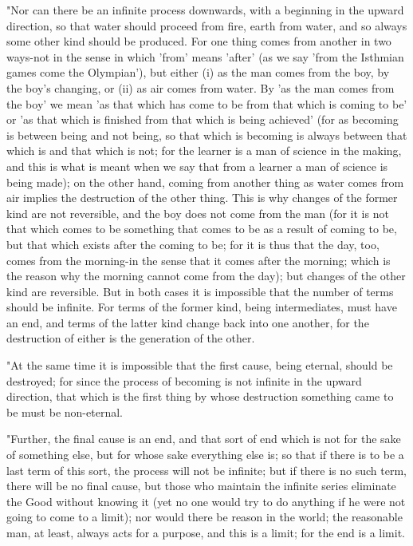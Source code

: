 "Nor can there be an infinite process downwards, with a beginning
in the upward direction, so that water should proceed from fire, earth
from water, and so always some other kind should be produced. For
one thing comes from another in two ways-not in the sense in which
'from' means 'after' (as we say 'from the Isthmian games come the
Olympian'), but either (i) as the man comes from the boy, by the boy's
changing, or (ii) as air comes from water. By 'as the man comes from
the boy' we mean 'as that which has come to be from that which is
coming to be' or 'as that which is finished from that which is being
achieved' (for as becoming is between being and not being, so that
which is becoming is always between that which is and that which is
not; for the learner is a man of science in the making, and this is
what is meant when we say that from a learner a man of science is
being made); on the other hand, coming from another thing as water
comes from air implies the destruction of the other thing. This is
why changes of the former kind are not reversible, and the boy does
not come from the man (for it is not that which comes to be something
that comes to be as a result of coming to be, but that which exists
after the coming to be; for it is thus that the day, too, comes from
the morning-in the sense that it comes after the morning; which is
the reason why the morning cannot come from the day); but changes
of the other kind are reversible. But in both cases it is impossible
that the number of terms should be infinite. For terms of the former
kind, being intermediates, must have an end, and terms of the latter
kind change back into one another, for the destruction of either is
the generation of the other. 

"At the same time it is impossible that the first cause, being eternal,
should be destroyed; for since the process of becoming is not infinite
in the upward direction, that which is the first thing by whose destruction
something came to be must be non-eternal. 

"Further, the final cause is an end, and that sort of end which is
not for the sake of something else, but for whose sake everything
else is; so that if there is to be a last term of this sort, the process
will not be infinite; but if there is no such term, there will be
no final cause, but those who maintain the infinite series eliminate
the Good without knowing it (yet no one would try to do anything if
he were not going to come to a limit); nor would there be reason in
the world; the reasonable man, at least, always acts for a purpose,
and this is a limit; for the end is a limit. 

